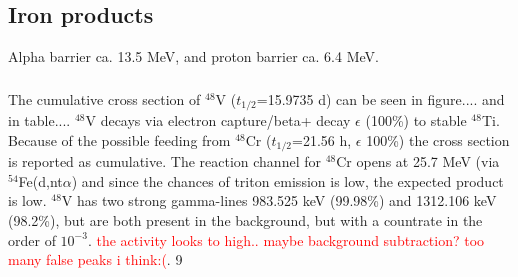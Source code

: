 \subsection{Iron products}
Alpha barrier ca. 13.5 MeV, and proton barrier ca. 6.4 MeV.


\subsubsection{}
The cumulative cross section of $^{48}$V ($t_{1/2}$=15.9735 d) can be seen in figure.... and in table.... $^{48}$V decays via electron capture/beta+ decay $\epsilon$ (100\%) to stable $^{48}$Ti. Because of the possible feeding from $^{48}$Cr ($t_{1/2}$=21.56 h, $\epsilon$ 100\%) the cross section is reported as cumulative. The reaction channel for $^{48}$Cr opens at 25.7 MeV (via $^{54}$Fe(d,nt$\alpha$) and since the chances of triton emission is low, the expected product is low. $^{48}$V has two strong gamma-lines 983.525 keV (99.98\%) and 1312.106 keV (98.2\%), but are both present in the background, but with a countrate in the order of $10^{-3}$. \textcolor{red}{the activity looks to high.. maybe background subtraction? too many false peaks i think:(}.
9

\subsubsection{}
\hspace{6cm}
\subsubsection{}
\hspace{6cm}
\subsubsection{}
\hspace{6cm}
\subsubsection{}
\hspace{6cm}
\subsubsection{}
\hspace{6cm}
